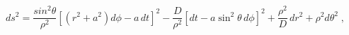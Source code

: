 \begin{equation} \label{eqp2} 
ds^2= \frac{sin^2{\theta}}{\rho^2} \left[
\left( r^2 +a^2 \right) d\phi - a \, dt \right]^2-\frac{D}{\rho^2} \left[ 
dt - a \sin^2{ \theta } \, d\phi \right]^2 +\frac{\rho^2}{D} \, dr^2 +
{\rho^2} d\theta^2  \;,
\end{equation} 

